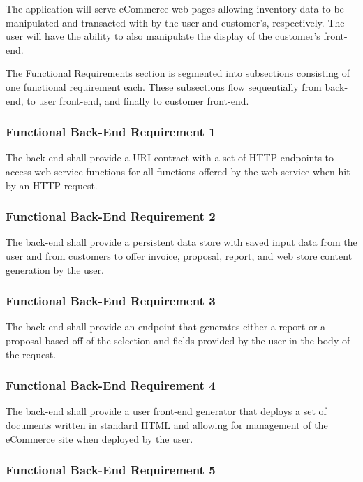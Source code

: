 \documentclass{article}
\begin{document}
The application will serve eCommerce web pages allowing inventory data to be
manipulated and transacted with by the user and customer's, respectively.  The
user will have the ability to also manipulate the display of the customer's
front-end.

The Functional Requirements section is segmented into subsections consisting of
one functional requirement each.  These subsections flow sequentially from
back-end, to user front-end, and finally to customer front-end.

\subsubsection{Functional Back-End Requirement 1}
\label{func-back-end-1}

The back-end shall provide a URI contract with a set of HTTP endpoints
to access web service functions for all functions offered by the web service
when hit by an HTTP request.

\subsubsection{Functional Back-End Requirement 2}
\label{func-back-end-2}

The back-end shall provide a persistent data store with saved input data from
the user and from customers to offer invoice, proposal, report, and web store
content generation by the user.

\subsubsection{Functional Back-End Requirement 3}
\label{func-back-end-3}

The back-end shall provide an endpoint that generates either a report or a
proposal based off of the selection and fields provided by the user in the
body of the request.

\subsubsection{Functional Back-End Requirement 4}
\label{func-back-end-4}

The back-end shall provide a user front-end generator that deploys a set of
documents written in standard HTML and allowing for management of the eCommerce
site when deployed by the user.

\subsubsection{Functional Back-End Requirement 5}
\label{func-back-end-5}
\end{document}
